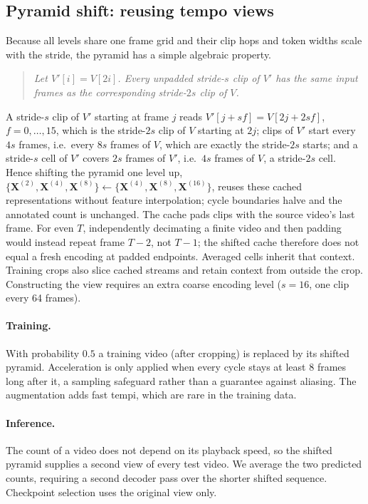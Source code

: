 \subsection{Pyramid shift: reusing tempo views}
\label{sec:shift}
Because all levels share one frame grid and their clip hops and token widths
scale with the stride, the pyramid has a simple algebraic property.
\begin{quote}\itshape
Let $V'[i]=V[2i]$. Every unpadded stride-$s$ clip of $V'$ has the same input
frames as the corresponding stride-$2s$ clip of $V$.
\end{quote}
A stride-$s$ clip of $V'$ starting at frame $j$ reads $V'[j+sf]=V[2j+2sf]$,
$f=0,\dots,15$, which is the stride-$2s$ clip of $V$ starting at $2j$; clips of
$V'$ start every $4s$ frames, i.e.\ every $8s$ frames of $V$, which are exactly
the stride-$2s$ starts; and a stride-$s$ cell of $V'$ covers $2s$ frames of
$V'$, i.e.\ $4s$ frames of $V$, a stride-$2s$ cell. Hence shifting the pyramid one
level up, $\{\mathbf{X}^{(2)},\mathbf{X}^{(4)},\mathbf{X}^{(8)}\}\leftarrow
\{\mathbf{X}^{(4)},\mathbf{X}^{(8)},\mathbf{X}^{(16)}\}$, reuses these cached
representations without feature interpolation; cycle boundaries halve and the
annotated count is unchanged. The cache pads clips with the source video's last
frame. For even $T$, independently decimating a finite video and then padding
would instead repeat frame $T-2$, not $T-1$; the shifted cache therefore does not
equal a fresh encoding at padded endpoints. Averaged cells inherit that context.
Training crops also slice cached streams and retain context from outside the
crop. Constructing the view requires an extra coarse encoding level
($s{=}16$, one clip every 64 frames).

\paragraph{Training.} With probability $0.5$ a training video (after cropping) is
replaced by its shifted pyramid. Acceleration is only applied when every cycle
stays at least 8 frames long after it, a sampling safeguard rather than a
guarantee against aliasing. The augmentation adds fast tempi, which are rare in
the training data.

\paragraph{Inference.} The count of a video does not depend on its playback
speed, so the shifted pyramid supplies a second view of every test video.
We average the two predicted counts, requiring a second decoder pass over the
shorter shifted sequence. Checkpoint selection uses the original view only.

